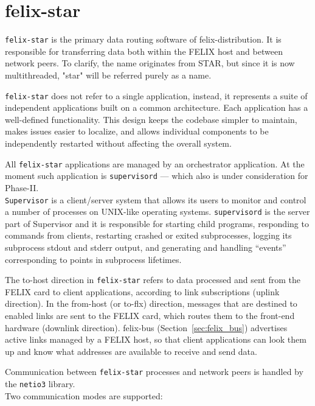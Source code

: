 \chapter{felix-star}
\label{chap:felix_star}

\texttt{felix-star} \cite{felix-software-specs} is the primary data routing software of felix-distribution. It is responsible for transferring data both within the \acs{FELIX} host and between network peers. To clarify, the name originates from \ac{STAR}, but since it is now multithreaded, "star" will be referred purely as a name.

\texttt{felix-star} does not refer to a single application, instead, it represents a suite of independent applications built on a common architecture. Each application has a well-defined functionality. This design keeps the codebase simpler to maintain, makes issues easier to localize, and allows individual components to be independently restarted without affecting the overall system.

All \texttt{felix-star} applications are managed by an orchestrator application. At the moment such application is \texttt{supervisord} \cite{supervisord}— which also is under consideration for Phase-II.\\
\texttt{Supervisor} \cite{supervisord} is a client/server system that allows its users to monitor and control a number of processes on UNIX-like operating systems. \texttt{supervisord} is the server part of Supervisor and it is responsible for starting child programs, responding to commands from clients, restarting crashed or exited subprocesses, logging its subprocess stdout and stderr output, and generating and handling “events” corresponding to points in subprocess lifetimes.

The to-host direction in \texttt{felix-star} refers to data processed and sent from the \acs{FELIX} card to client applications, according to link subscriptions (uplink direction). In the from-host (or to-flx) direction, messages that are destined to enabled links are sent to the \acs{FELIX} card, which routes them to the front-end hardware (downlink direction). felix-bus (Section~\ref{sec:felix_bus}) advertises active links managed by a \acs{FELIX} host, so that client applications can look them up and know what addresses are available to receive and send data.

Communication between \texttt{felix-star} processes and network peers is handled by the \texttt{netio3} library.\\
 Two communication modes are supported:

